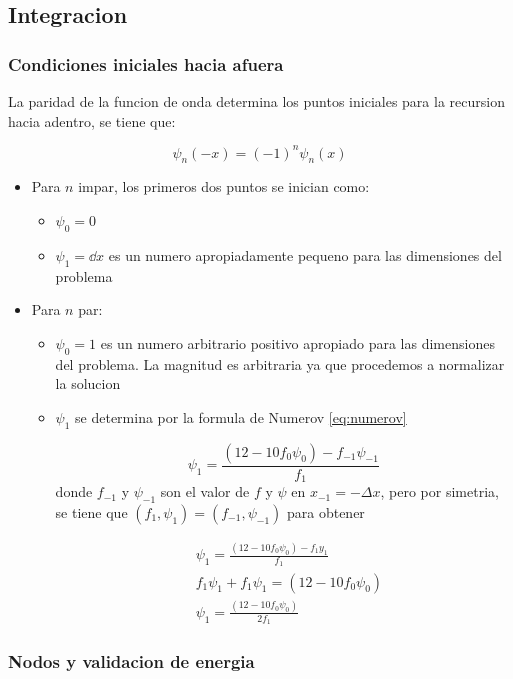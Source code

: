 \documentclass[11pt]{article}
\begin{document}
\subsection{Integracion}
\label{sec:orgff92265}

\subsubsection{Condiciones iniciales hacia afuera}
\label{sec:orgb16996d}

La paridad de la funcion de onda determina los puntos iniciales para la recursion hacia adentro, se tiene que:

\[ \psi_n(-x) = (-1)^n\psi_n(x) \]

\begin{itemize}
\item Para \(n\) impar, los primeros dos puntos se inician como:
\begin{itemize}
\item \(\psi_0 = 0\)
\item \(\psi_1 = \dd{x}\) es un numero apropiadamente pequeno para las dimensiones del problema
\end{itemize}

\item Para \(n\) par:
\begin{itemize}
\item \(\psi_0 = 1\) es un numero arbitrario positivo apropiado para las dimensiones del problema. La magnitud es arbitraria ya que procedemos a normalizar la solucion

\item \(\psi_1\) se determina por la formula de Numerov \ref{eq:numerov}

\[ \psi_1 = \frac{(12 - 10 f_0\psi_0)-f_{-1}\psi_{-1}}{f_1} \]
donde \(f_{-1}\) y \(\psi_{-1}\) son el valor de \(f\) y \(\psi\) en \(x_{-1} = - \Delta x\), pero por simetria, se tiene que \((f_1,\psi_1) = (f_{-1},\psi_{-1})\) para obtener

\begin{align*}
    &\psi_1 = \frac{(12 - 10f_0\psi_0) - f_1y_1}{f_1} \\
    &f_1\psi_1 + f_1\psi_1 = (12 - 10f_0\psi_0) \\
    &\psi_1 = \frac{(12 - 10f_0\psi_0)}{2f_1}
\end{align*}
\end{itemize}
\end{itemize}
\subsubsection{Nodos y validacion de energia}
\label{sec:orgcd80863}
\end{document}
